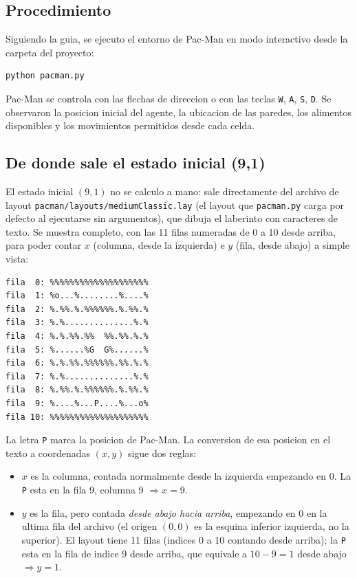 \subsection{Procedimiento}

Siguiendo la guia, se ejecuto el entorno de Pac-Man en modo interactivo desde la carpeta del
proyecto:

\begin{verbatim}
python pacman.py
\end{verbatim}

Pac-Man se controla con las flechas de direccion o con las teclas \texttt{W}, \texttt{A},
\texttt{S}, \texttt{D}. Se observaron la posicion inicial del agente, la ubicacion de las
paredes, los alimentos disponibles y los movimientos permitidos desde cada celda.

\subsection{De donde sale el estado inicial (9,1)}

El estado inicial $(9,1)$ no se calculo a mano: sale directamente del archivo de layout
\texttt{pacman/layouts/mediumClassic.lay} (el layout que \texttt{pacman.py} carga por defecto al
ejecutarse sin argumentos), que dibuja el laberinto con caracteres de texto. Se muestra completo,
con las 11 filas numeradas de 0 a 10 desde arriba, para poder contar $x$ (columna, desde la
izquierda) e $y$ (fila, desde abajo) a simple vista:

\begin{verbatim}
fila  0: %%%%%%%%%%%%%%%%%%%%
fila  1: %o...%........%....%
fila  2: %.%%.%.%%%%%%.%.%%.%
fila  3: %.%..............%.%
fila  4: %.%.%%.%%  %%.%%.%.%
fila  5: %......%G  G%......%
fila  6: %.%.%%.%%%%%%.%%.%.%
fila  7: %.%..............%.%
fila  8: %.%%.%.%%%%%%.%.%%.%
fila  9: %....%...P....%...o%
fila 10: %%%%%%%%%%%%%%%%%%%%
\end{verbatim}

La letra \texttt{P} marca la posicion de Pac-Man. La conversion de esa posicion en el texto a
coordenadas $(x,y)$ sigue dos reglas:

\begin{itemize}
\item \textbf{$x$} es la columna, contada normalmente desde la izquierda empezando en 0. La
  \texttt{P} esta en la fila 9, columna 9 $\Rightarrow x=9$.
\item \textbf{$y$} es la fila, pero contada \emph{desde abajo hacia arriba}, empezando en 0 en la
  ultima fila del archivo (el origen $(0,0)$ es la esquina inferior izquierda, no la superior). El
  layout tiene 11 filas (indices 0 a 10 contando desde arriba); la \texttt{P} esta en la fila de
  indice 9 desde arriba, que equivale a $10-9=1$ desde abajo $\Rightarrow y=1$.
\end{itemize}

